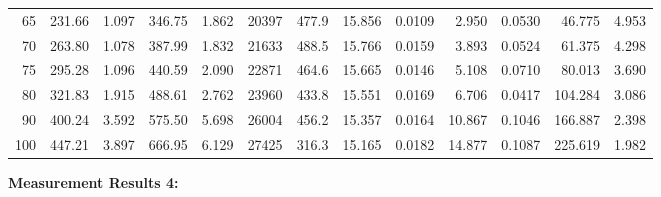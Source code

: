 \documentclass[10pt]{article}
\begin{document}
{\begin{tabular}{|r|rr|rr|rr|rr|rr|r|r|}
       65 &       231.66 &        1.097 &       346.75 &        1.862 &        20397 &        477.9 &       15.856 &       0.0109 &        2.950 &       0.0530 &       46.775 &        4.953 \\
       70 &       263.80 &        1.078 &       387.99 &        1.832 &        21633 &        488.5 &       15.766 &       0.0159 &        3.893 &       0.0524 &       61.375 &        4.298 \\
       75 &       295.28 &        1.096 &       440.59 &        2.090 &        22871 &        464.6 &       15.665 &       0.0146 &        5.108 &       0.0710 &       80.013 &        3.690 \\
       80 &       321.83 &        1.915 &       488.61 &        2.762 &        23960 &        433.8 &       15.551 &       0.0169 &        6.706 &       0.0417 &      104.284 &        3.086 \\
       90 &       400.24 &        3.592 &       575.50 &        5.698 &        26004 &        456.2 &       15.357 &       0.0164 &       10.867 &       0.1046 &      166.887 &        2.398 \\
      100 &       447.21 &        3.897 &       666.95 &        6.129 &        27425 &        316.3 &       15.165 &       0.0182 &       14.877 &       0.1087 &      225.619 &        1.982 \\
\hline
\end{tabular}
}

\vspace{3mm}

\noindent
{\large \bf Measurement Results 4:}
\vspace{3mm}
\end{document}
